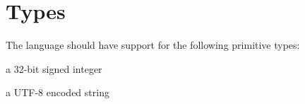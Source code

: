 \section{Types}

The language should have support for the following primitive types:

\begin{description}[noitemsep]
\item[Integer] a 32-bit signed integer
\item[String] a UTF-8 encoded string
\end{description}
